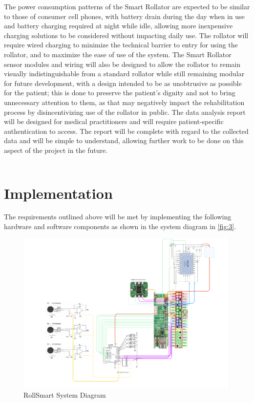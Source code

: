 \documentclass{article}
\begin{document}
The power consumption patterns of the Smart Rollator are expected to be similar to those of consumer cell phones, with battery drain during the day when in use and battery charging required at night while idle, allowing more inexpensive charging solutions to be considered without impacting daily use. The rollator will require wired charging to minimize the technical barrier to entry for using the rollator, and to maximize the ease of use of the system. The Smart Rollator sensor modules and wiring will also be designed to allow the rollator to remain visually indistinguishable from a standard rollator while still remaining modular for future development, with a design intended to be as unobtrusive as possible for the patient; this is done to preserve the patient's dignity and not to bring unnecessary attention to them, as that may negatively impact the rehabilitation process by disincentivizing use of the rollator in public. The data analysis report will be designed for medical practitioners and will require patient-specific authentication to access. The report will be complete with regard to the collected data and will be simple to understand, allowing further work to be done on this aspect of the project in the future. \\ \\

\section{Implementation}
The requirements outlined above will be met by implementing the following hardware and software components as shown in the system diagram in \autoref{fig:3}.

\begin{figure}[!h]
    \centering
    \includegraphics[scale=0.45 ]{sysc4907_system_diagram.png}
    \caption{RollSmart System Diagram}
    \label{fig:3}
\end{figure}
\end{document}
